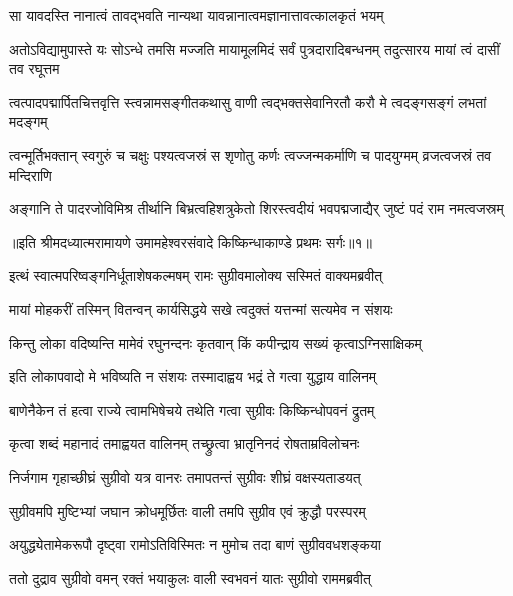 \twolineshloka
{सा यावदस्ति नानात्वं तावद्भवति नान्यथा}
{यावन्नानात्वमज्ञानात्तावत्कालकृतं भयम्} %

\threelineshloka
{अतोऽविद्यामुपास्ते यः सोऽन्धे तमसि मज्जति}
{मायामूलमिदं सर्वं पुत्रदारादिबन्धनम्}
{तदुत्सारय मायां त्वं दासीं तव रघूत्तम} %

\fourlineindentedshloka
{त्वत्पादपद्मार्पितचित्तवृत्ति\-}
{स्त्वन्नामसङ्गीतकथासु वाणी}
{त्वद्भक्तसेवानिरतौ करौ मे}
{त्वदङ्गसङ्गं लभतां मदङ्गम्} %

\fourlineindentedshloka
{त्वन्मूर्तिभक्तान् स्वगुरुं च चक्षुः}
{पश्यत्वजस्रं स शृणोतु कर्णः}
{त्वज्जन्मकर्माणि च पादयुग्मम्}
{व्रजत्वजस्रं तव मन्दिराणि} %

\fourlineindentedshloka
{अङ्गानि ते पादरजोविमिश्र\-}
{तीर्थानि बिभ्रत्वहिशत्रुकेतो}
{शिरस्त्वदीयं भवपद्मजाद्यैर्\-}
{जुष्टं पदं राम नमत्वजस्रम्} %

{॥इति श्रीमदध्यात्मरामायणे उमामहेश्वरसंवादे किष्किन्धाकाण्डे
प्रथमः सर्गः॥१॥
}




\twolineshloka
{इत्थं स्वात्मपरिष्वङ्गनिर्धूताशेषकल्मषम्}
{रामः सुग्रीवमालोक्य सस्मितं वाक्यमब्रवीत्} %

\twolineshloka
{मायां मोहकरीं तस्मिन् वितन्वन् कार्यसिद्धये}
{सखे त्वदुक्तं यत्तन्मां सत्यमेव न संशयः} %

\twolineshloka
{किन्तु लोका वदिष्यन्ति मामेवं रघुनन्दनः}
{कृतवान् किं कपीन्द्राय सख्यं कृत्वाऽग्निसाक्षिकम्} %

\twolineshloka
{इति लोकापवादो मे भविष्यति न संशयः}
{तस्मादाह्वय भद्रं ते गत्वा युद्धाय वालिनम्} %

\twolineshloka
{बाणेनैकेन तं हत्वा राज्ये त्वामभिषेचये}
{तथेति गत्वा सुग्रीवः किष्किन्धोपवनं द्रुतम्} %

\twolineshloka
{कृत्वा शब्दं महानादं तमाह्वयत वालिनम्}
{तच्छ्रुत्वा भ्रातृनिनदं रोषताम्रविलोचनः} %

\twolineshloka
{निर्जगाम गृहाच्छीघ्रं सुग्रीवो यत्र वानरः}
{तमापतन्तं सुग्रीवः शीघ्रं वक्षस्यताडयत्} %

\twolineshloka
{सुग्रीवमपि मुष्टिभ्यां जघान क्रोधमूर्छितः}
{वाली तमपि सुग्रीव एवं क्रुद्धौ परस्परम्} %

\twolineshloka
{अयुद्ध्येतामेकरूपौ दृष्ट्वा रामोऽतिविस्मितः}
{न मुमोच तदा बाणं सुग्रीववधशङ्कया} %

\twolineshloka
{ततो दुद्राव सुग्रीवो वमन् रक्तं भयाकुलः}
{वाली स्वभवनं यातः सुग्रीवो राममब्रवीत्} %

